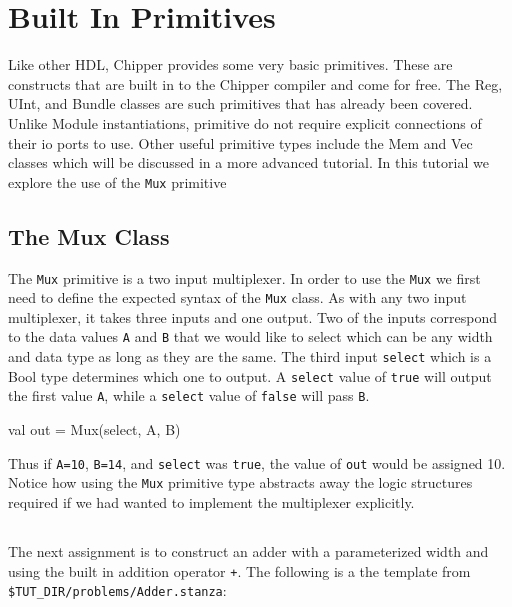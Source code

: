 \section{Built In Primitives}

Like other HDL, Chipper provides some very basic primitives. These are constructs that are built in to the Chipper compiler and come for free. The Reg, UInt, and Bundle classes are such primitives that has already been covered. Unlike Module instantiations, primitive do not require explicit connections of their io ports to use. Other useful primitive types include the Mem and Vec classes which will be discussed in a more advanced tutorial. In this tutorial we explore the use of the \verb+Mux+ primitive

\subsection{The Mux Class}

The \verb+Mux+ primitive is a two input multiplexer. In order to use the \verb+Mux+ we first need to define the expected syntax of the \verb+Mux+ class. As with any two input multiplexer, it takes three inputs and one output. Two of the inputs correspond to the data values \verb+A+ and \verb+B+ that we would like to select which can be any width and data type as long as they are the same. The third input \verb+select+ which is a Bool type determines which one to output.
A \verb+select+ value of \verb+true+ will output the first value \verb+A+, while a \verb+select+ value of \verb+false+ will pass \verb+B+.

\begin{stanza}
val out = Mux(select, A, B)
\end{stanza}

Thus if \verb+A=10+, \verb+B=14+, and \verb+select+ was \verb+true+, the value of \verb+out+ would be assigned 10. Notice how using the \verb+Mux+ primitive type abstracts away the logic structures required if we had wanted to implement the multiplexer explicitly.

\subsection{}

The next assignment is to construct an adder with a parameterized width and using the built in addition operator \verb!+!.
The following is a the template from \verb+$TUT_DIR/problems/Adder.stanza+:

